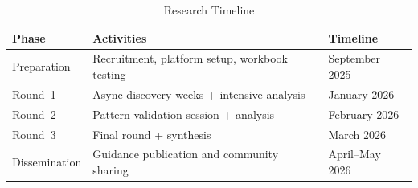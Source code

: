 \begin{table}[htbp]
    \centering
    \caption{Research Timeline}\label{tab:timeline}
    \begin{tabular}{|l|l|l|}
        \hline
        \textbf{Phase} & \textbf{Activities}                           & \textbf{Timeline} \\
        \hline
        Preparation    & Recruitment, platform setup, workbook testing & September 2025    \\
        \hline
        Round~1        & Async discovery weeks + intensive analysis    & January 2026      \\
        \hline
        Round~2        & Pattern validation session + analysis         & February 2026     \\
        \hline
        Round~3        & Final round + synthesis                       & March 2026        \\
        \hline
        Dissemination  & Guidance publication and community sharing    & April--May 2026   \\
        \hline
    \end{tabular}
\end{table}

